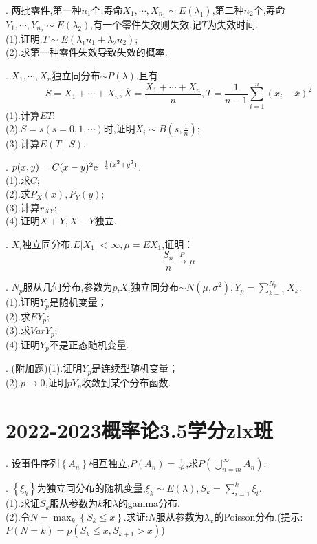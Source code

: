 . 两批零件,第一种$n_1$个,寿命$X_1,\cdots,X_{n_1}\sim E(\lambda_1)$,第二种$n_2$个,寿命$Y_1,\cdots,Y_{n_2}\sim E(\lambda_2)$,有一个零件失效则失效.记$T$为失效时间.\\
(1).证明:$T\sim E(\lambda_1n_1+\lambda_2n_2)$;\\
(2).求第一种零件失效导致失效的概率.

. $X_1,\cdots,X_n$独立同分布$\sim P(\lambda)$.且有$$S=X_1+\cdots+X_n,\overline{X}=\frac{X_1+\cdots+X_n}{n},T=\frac{1}{n-1}\sum_{i=1}^{n}(x_i-\overline{x})^2$$
(1).计算$ET$;\\
(2).$S=s(s=0,1,\cdots)$时,证明$X_i\sim B(s,\frac{1}{n})$;\\
(3).计算$E(T\mid S)$.

. $p(x,y)=C(x-y)^2{\rm e}^{-\frac{1}{2}(x^2+y^2)}$.\\
(1).求$C$;\\
(2).求$P_X(x),P_Y(y)$;\\
(3).计算$r_{XY}$;\\
(4).证明$X+Y,X-Y$独立.

. $X_i$独立同分布,$E|X_1|<\infty,\mu=EX_1$,证明：$$\frac{S_n}{n}\xrightarrow{P}\mu$$

. $N_p$服从几何分布,参数为$p$,$X_i$独立同分布$\sim N(\mu,\sigma^2),Y_p=\sum_{k=1}^{N_p}X_k$.\\
(1).证明$Y_p$是随机变量；\\
(2).求$EY_p$;\\
(3).求$Var Y_p$;\\
(4).证明$Y_p$不是正态随机变量.

. (附加题)(1).证明$Y_p$是连续型随机变量；\\
(2).$p\to 0$,证明$pY_p$收敛到某个分布函数.
\newpage

\section{2022-2023概率论3.5学分zlx班}
. 设事件序列$\left\{A_n\right\}$相互独立,$P(A_n)=\frac{1}{n^2}$,求$P\left(\bigcup_{n=m}^{\infty}A_n\right)$.

. $\left\{\xi_k\right\}$为独立同分布的随机变量,$\xi_k\sim E(\lambda),S_k=\sum_{i=1}^k\xi_i$.\\
(1).求证$S_k$服从参数为$k$和$\lambda$的gamma分布.\\
(2).令$N=\max_{k}\left\{S_k\leq x\right\}$.求证:$N$服从参数为$\lambda_x$的Poisson分布.(提示:$P(N=k)=p(S_k\leq x,S_{k+1}>x)$)

